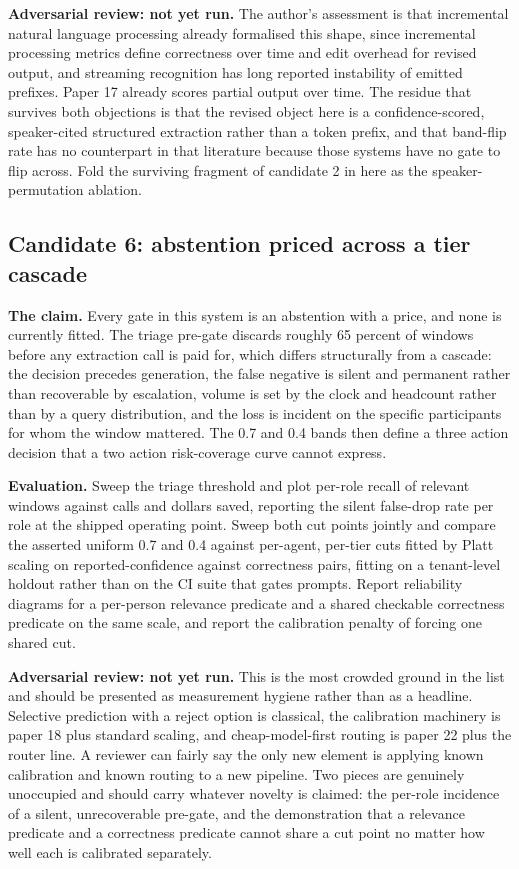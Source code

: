 \textbf{Adversarial review: not yet run.} The author's assessment is that
incremental natural language processing already formalised this shape, since
incremental processing metrics define correctness over time and edit overhead
for revised output, and streaming recognition has long reported instability of
emitted prefixes. Paper 17 already scores partial output over time. The residue
that survives both objections is that the revised object here is a
confidence-scored, speaker-cited structured extraction rather than a token
prefix, and that band-flip rate has no counterpart in that literature because
those systems have no gate to flip across. Fold the surviving fragment of
candidate 2 in here as the speaker-permutation ablation.

\subsection{Candidate 6: abstention priced across a tier cascade}

\textbf{The claim.} Every gate in this system is an abstention with a price,
and none is currently fitted. The triage pre-gate discards roughly 65 percent
of windows before any extraction call is paid for, which differs structurally
from a cascade: the decision precedes generation, the false negative is silent
and permanent rather than recoverable by escalation, volume is set by the clock
and headcount rather than by a query distribution, and the loss is incident on
the specific participants for whom the window mattered. The 0.7 and 0.4 bands
then define a three action decision that a two action risk-coverage curve
cannot express.

\textbf{Evaluation.} Sweep the triage threshold and plot per-role recall of
relevant windows against calls and dollars saved, reporting the silent
false-drop rate per role at the shipped operating point. Sweep both cut points
jointly and compare the asserted uniform 0.7 and 0.4 against per-agent, per-tier
cuts fitted by Platt scaling on reported-confidence against correctness pairs,
fitting on a tenant-level holdout rather than on the CI suite that gates
prompts. Report reliability diagrams for a per-person relevance predicate and a
shared checkable correctness predicate on the same scale, and report the
calibration penalty of forcing one shared cut.

\textbf{Adversarial review: not yet run.} This is the most crowded ground in
the list and should be presented as measurement hygiene rather than as a
headline. Selective prediction with a reject option is classical, the
calibration machinery is paper 18 plus standard scaling, and cheap-model-first
routing is paper 22 plus the router line. A reviewer can fairly say the only
new element is applying known calibration and known routing to a new pipeline.
Two pieces are genuinely unoccupied and should carry whatever novelty is
claimed: the per-role incidence of a silent, unrecoverable pre-gate, and the
demonstration that a relevance predicate and a correctness predicate cannot
share a cut point no matter how well each is calibrated separately.

